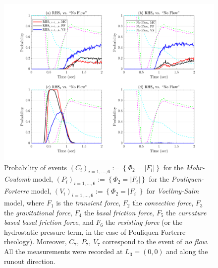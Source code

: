 \documentclass{article}
\begin{document}
\begin{figure}[H]
        \centering
        \includegraphics[width=1\textwidth]{InclinedPlane/Dominance1/DominancePrX_L3.png}
        \caption{Probability of events $(C_i)_{i=1,...,6}:=\left\{\Phi_2=|F_i|\right\}$ for the \emph{Mohr-Coulomb} model, $(P_i)_{i=1,...,6}:=\left\{\Phi_2=|F_i|\right\}$ for the \emph{Pouliquen-Forterre} model, $(V_i)_{i=1,...,6}:=\left\{\Phi_2=|F_i|\right\}$ for \emph{Voellmy-Salm} model, where $F_1$ is the \emph{transient force}, $F_2$ the \emph{convective force}, $F_3$ the \emph{gravitational force}, $F_4$ the \emph{basal friction force}, $F_5$ the \emph{curvature based basal friction force}, and $F_6$ the \emph{resisting force} (or the hydrostatic pressure term, in the case of Pouliquen-Forterre rheology). Moreover, $C_7,\ P_7,\ V_7$ correspond to the event of \emph{no flow}. All the measurements were recorded at $L_3=(0,0)$ and along the runout direction.}
        \label{fig:Ramp-FXDominance1-L3}
\end{figure}
\end{document}
